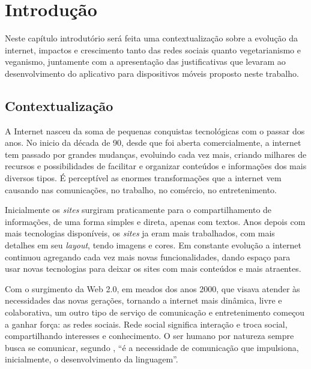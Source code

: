 
\chapter{Introdução}

Neste capítulo introdutório será feita uma contextualização sobre a evolução da internet, impactos e crescimento tanto das redes sociais quanto vegetarianismo e veganismo, juntamente com a apresentação das justificativas que levaram ao desenvolvimento do aplicativo para dispositivos móveis proposto neste trabalho.

\section{Contextualização}

A Internet nasceu da soma de pequenas conquistas tecnológicas com o passar dos anos. No inicio da década de 90, desde que foi aberta comercialmente, a internet tem passado por grandes mudanças, evoluindo cada vez mais, criando milhares de recursos e possibilidades de facilitar e organizar conteúdos e informações dos mais diversos tipos. É perceptível as enormes transformações que a internet vem causando nas comunicações, no trabalho, no comércio, no entretenimento.

Inicialmente os \textit{sites} surgiram praticamente para o compartilhamento de informações, de uma forma simples e direta, apenas com textos. Anos depois com mais tecnologias disponíveis, os \textit{sites} ja eram mais trabalhados, com mais detalhes em seu \textit{layout}, tendo imagens e cores. Em constante evolução a internet continuou agregando cada vez mais novas funcionalidades, dando espaço para usar novas tecnologias para deixar os sites com mais conteúdos e mais atraentes.

Com o surgimento da Web 2.0, em meados dos anos 2000, que visava atender às necessidades das novas gerações, tornando a internet mais dinâmica, livre e colaborativa, um outro tipo de serviço de comunicação e entretenimento começou a ganhar força: as redes sociais. Rede social significa interação e troca social, compartilhando interesses e conhecimento. O ser humano por natureza sempre busca se comunicar, segundo \citeauthor{oliveira-marta}, “é a necessidade de comunicação que impulsiona, inicialmente, o desenvolvimento da linguagem”.

